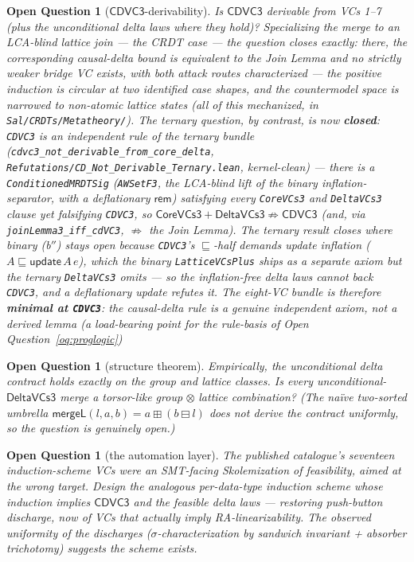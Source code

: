 \documentclass[11pt]{article}
\newtheorem{openq}[theorem]{Open Question}
\newcommand{\mergeL}{\mathsf{mergeL}}
\newcommand{\cd}{\mathsf{CDVC3}}
\newcommand{\lean}[1]{\texttt{#1}}
\begin{document}
\begin{openq}[$\cd$-derivability]
\label{oq:cd}
Is $\cd$ derivable from VCs 1--7 (plus the unconditional delta laws where
they hold)? Specializing the merge to an LCA-blind lattice join --- the
CRDT case --- the question closes exactly: there, the corresponding
causal-delta bound is \emph{equivalent} to the Join Lemma and no strictly
weaker bridge VC exists, with both attack routes
characterized --- the positive induction is circular at two identified case
shapes, and the countermodel space is narrowed to non-atomic lattice
states (all of this mechanized, in \lean{Sal/CRDTs/Metatheory/}). The
ternary question, by contrast, is now \textbf{closed}: \lean{CDVC3} is an
\emph{independent} rule of the ternary bundle
(\lean{cdvc3\_not\_derivable\_from\_core\_delta},
\lean{Refutations/CD\_Not\_Derivable\_Ternary.lean}, kernel-clean) --- there is
a \lean{ConditionedMRDTSig} (\lean{AWSetF3}, the LCA-blind lift of the binary
inflation-separator, with a deflationary $\mathsf{rem}$) satisfying every
\lean{CoreVCs3} and \lean{DeltaVCs3} clause yet falsifying \lean{CDVC3}, so
$\mathsf{CoreVCs3} + \mathsf{DeltaVCs3} \not\Rightarrow \mathsf{CDVC3}$ (and,
via \lean{joinLemma3\_iff\_cdVC3}, $\not\Rightarrow$ the Join Lemma). The
ternary result closes where binary (b$''$) stays open because
\lean{CDVC3}'s $\sqsubseteq$-half demands update \emph{inflation}
($A \sqsubseteq \mathsf{update}\,A\,e$), which the binary \lean{LatticeVCsPlus}
ships as a separate axiom but the ternary \lean{DeltaVCs3} omits ---
so the inflation-free delta laws cannot back \lean{CDVC3}, and a deflationary
update refutes it. The eight-VC bundle is therefore \textbf{minimal at
\lean{CDVC3}}: the causal-delta rule is a genuine independent axiom, not a
derived lemma (a load-bearing point for the rule-basis of
Open Question~\ref{oq:proglogic})
\end{openq}

\begin{openq}[structure theorem]
\label{oq:structure}
Empirically, the \emph{unconditional} delta contract holds exactly on the
group and lattice classes. Is every unconditional-$\mathsf{DeltaVCs3}$
merge a torsor-like group$\,\otimes\,$lattice combination? (The na\"ive
two-sorted umbrella $\mergeL(l,a,b) = a \boxplus (b \boxminus l)$ does
\emph{not} derive the contract uniformly, so the question is genuinely
open.)
\end{openq}

\begin{openq}[the automation layer]
The published catalogue's seventeen induction-scheme VCs were an
SMT-facing Skolemization of feasibility, aimed at the wrong target.
Design the analogous per-data-type induction scheme whose induction
implies $\cd$ and the feasible delta laws --- restoring push-button
discharge, now of VCs that actually imply RA-linearizability. The
observed uniformity of the discharges ($\sigma$-characterization by
sandwich invariant + absorber trichotomy) suggests the scheme exists.
\end{openq}
\end{document}

